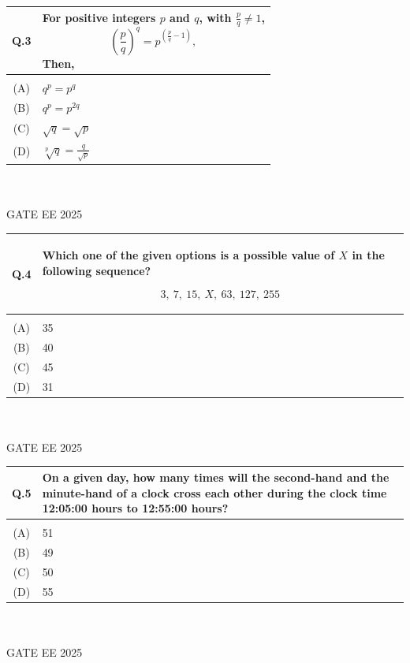 \documentclass[journal,12pt,onecolumn]{IEEEtran}
\theoremstyle{remark}
\begin{document}
\begin{tabular}{|c|p{16cm}|}
\hline
   Q.3 & For positive integers \( p \) and \( q \), with \( \frac{p}{q} \neq 1 \), 
\[
\left( \frac{p}{q} \right)^q = p^{\left( \frac{p}{q} - 1 \right)},
\]
Then,\\
   \hline
     & \\
    \hline
  (A) & \( q^p = p^q \)\\   
  \hline
  (B) & \( q^p = p^{2q} \)\\
  \hline
  (C) &  \( \sqrt{q} = \sqrt{p} \)\\
  \hline
  (D) & \( \sqrt[p]{q} = \frac{q}{\sqrt{p}} \) \\
  \hline
\end{tabular} 
~\\ \\
GATE EE 2025
\\

\begin{tabular}{|c|p{16cm}|}
\hline
   Q.4 & Which one of the given options is a possible value of \( X \) in the following sequence?

\[
3,\ 7,\ 15,\ X,\ 63,\ 127,\ 255
\]\\
   \hline
     & \\
    \hline
  (A) & 35 \\   
  \hline
  (B) & 40\\
  \hline
  (C) & 45\\
  \hline
  (D) & 31\\
  \hline
\end{tabular} 
~\\ \\
GATE EE 2025
\\

\begin{tabular}{|c|p{16cm}|}\hline
   Q.5 &  On a given day, how many times will the second-hand and the minute-hand of a clock cross each other during the clock time 12:05:00 hours to 12:55:00 hours?\\
   \hline
     & \\    \hline
  (A) & 51\\     \hline
  (B) & 49\\  \hline
  (C) & 50\\  \hline
  (D) & 55\\  \hline
\end{tabular} ~\\ \\
GATE EE 2025\\
\end{document}
